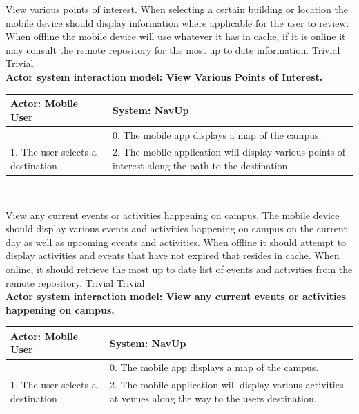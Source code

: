 \FuncReq
{View various points of interest.}
{When selecting a certain building or location the mobile device should display information where applicable for the user to review. When offline the mobile device will use whatever it has in cache, if it is online it may consult the remote repository for the most up to date information.}
{Trivial}
{Trivial}
	\\
    \textbf{Actor system interaction model: View Various Points of Interest. }\\
    \begin{tabular}{ | p{6cm} | p{6cm} |}
    \hline
    Actor: Mobile User & System: NavUp \\ \hline
    & 0. The mobile app displays a map of the campus.\\ \hline
    1. The user selects a destination & 2. The mobile application will display various points of interest along the path to the destination.\\ \hline
    \end{tabular}
\\
\bigskip

\FuncReq
{View any current events or activities happening on campus.}
{The mobile device should display various events and activities happening on campus on the current day as well as upcoming events and activities. When offline it should attempt to display activities and events that have not expired that resides in cache. When online, it should retrieve the most up to date list of events and activities from the remote repository.}
{Trivial}
{Trivial}
	\\
    \textbf{Actor system interaction model: View any current events or activities happening on campus. }\\
    \begin{tabular}{ | p{6cm} | p{6cm} |}
    \hline
    Actor: Mobile User & System: NavUp \\ \hline
    & 0. The mobile app displays a map of the campus.\\ \hline
    1. The user selects a destination & 2. The mobile application will display various activities at venues along the way to the users destination.
    \\ \hline
    \end{tabular}
\\
\bigskip

